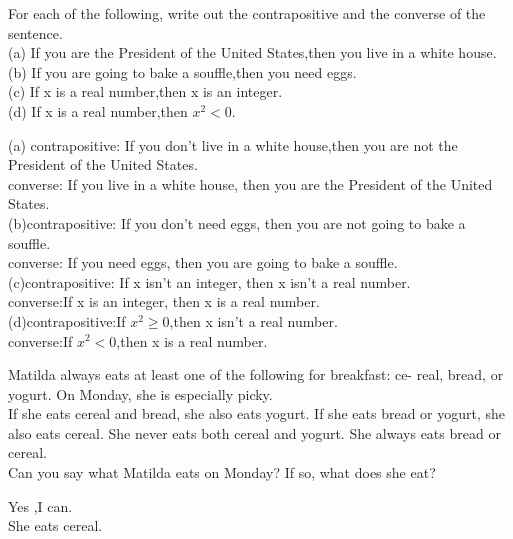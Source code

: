 \documentclass[11pt, a4paper, UTF8]{ctexart}
\begin{document}
\begin{problem}[UD:3.2]
For each of the following, write out the contrapositive and the converse of the sentence.\\
(a) If you are the President of the United States,then you live in a white house.\\
(b) If you are going to bake a souffle,then you need eggs.\\
(c) If x is a real number,then x is an integer.\\
(d) If x is a real number,then $x^2 <0$.
\end{problem}

\begin{solution}
(a) contrapositive: If you don't live in a white house,then you are not the President of the United States.\\
converse: If you live in a white house, then you are the President of the United States.\\
(b)contrapositive: If you don't need eggs, then you are not going to bake a souffle.\\
converse: If you need eggs, then you are going to bake a souffle.\\
(c)contrapositive: If x isn't an integer, then x isn't a real number.\\
converse:If x is an integer, then x is a real number.\\
(d)contrapositive:If $x^2 \ge 0$,then x isn't a real number.\\
converse:If $x^2<0$,then x is a real number.
\end{solution}

\begin{problem}[UD:3.6]
Matilda always eats at least one of the following for breakfast: ce- real, bread, or yogurt. On Monday, she is especially picky.\\
If she eats cereal and bread, she also eats yogurt. If she eats bread or yogurt, she also eats cereal. She never eats both cereal and yogurt. She always eats bread or cereal.\\
Can you say what Matilda eats on Monday? If so, what does she eat?
\end{problem}

\begin{solution}
Yes ,I can.\\
She eats cereal.
\end{solution}
\end{document}
